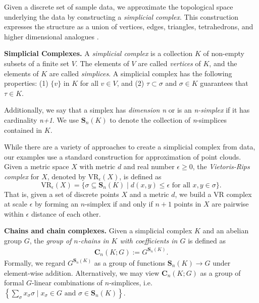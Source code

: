 \documentclass[utf8]{formatting_stuff/frontiersFPHY}
\newcommand{\Chains}{\mathbf{C}}
\newcommand{\Simplices}[0]{\mathbf{S}}
\theoremstyle{plain}
\theoremstyle{definition}
\begin{document}
 
Given a discrete set of sample data, we approximate the topological space underlying the data by constructing a \textit{simplicial complex}. This construction expresses the structure as a union of vertices, edges, triangles, tetrahedrons, and higher dimensional analogues  \cite{Carlsson2009TopologyAD}.  



\noindent \textbf{Simplicial Complexes.} A \textit{simplicial complex} is a collection $K$ of non-empty subsets of a finite set $V$. The elements of $V$ are called \textit{vertices} of $K$, and the elements of $K$ are called \textit{simplices}. A simplicial complex has the following properties: (1) $\{v\}$ in $K$ for all $v \in V$, and (2) $\tau \subset \sigma$ and $\sigma \in K$ guarantees that $\tau \in K$. 


Additionally, we say that a simplex has \textit{dimension n} or is an \textit{n-simplex} if it has cardinality \textit{n+1}. We use $\Simplices_n(K)$ to denote the collection of \textit{n}-simplices contained in $K$. 


While there are a variety of approaches to create a simplicial complex from data, our examples use a standard construction for approximation of point clouds.  Given a metric space $X$ with metric $d$ and real number $\epsilon \ge 0$, the \textit{Vietoris-Rips complex} for $X$, denoted by $\text{VR}_\epsilon(X)$, is defined as $$\text{VR}_\epsilon (X) = \{\sigma \subseteq \Simplices_n(K) \mid d(x,y) \leq  \epsilon \text{ for all } x, y \in \sigma\}.$$
That is, given a set of discrete points $X$ and a metric $d$, we build a VR complex at scale $\epsilon$ by forming an $n$-simplex if and only if $n+1$ points in $X$ are pairwise within $\epsilon$ distance of each other. 

\noindent \textbf{Chains and chain complexes.}
Given a simplicial complex $K$ and an abelian group  $G$, the \emph{group of $n$-chains in $K$ with coefficients in $G$} is defined as
%
    \begin{align*}
        \Chains_n(K; G) 
        :=
        G^{\Simplices_n(K)}.
    \end{align*}
%    
Formally, we regard $G^{\Simplices_n(K)}$ as a group of functions $\Simplices_n(K) \to G$ under element-wise addition. Alternatively, we may view $\Chains_n(K; G)$ as a group of formal $G$-linear combinations of $n$-simplices, i.e. $\left \{\sum_{\sigma}x_{\sigma} \sigma \mid x_{\sigma} \in G \text{ and } \sigma \in \Simplices_n(K) \right \}$.
\end{document}
